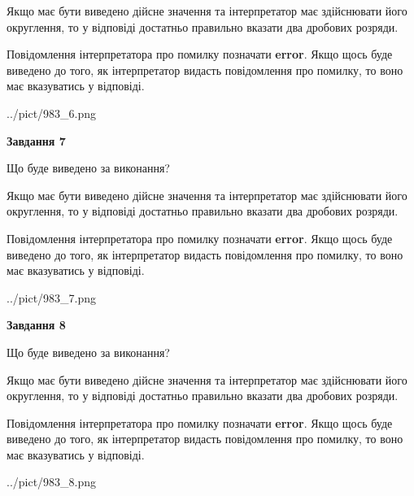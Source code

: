\documentclass[12pt, ukrainian]{article}
\begin{document}
{\begin {Large}
Якщо має бути виведено дійсне значення та інтерпретатор має здійснювати його округлення, 
то у відповіді достатньо правильно вказати два дробових розряди.

Повідомлення інтерпретатора про помилку позначати \textbf{error}.
Якщо щось буде виведено до того, як інтерпретатор видасть повідомлення про помилку, 
то воно має вказуватись у відповіді. \par

\begin{center}
	{../pict/983_6.png}
\end{center}
\newpage

{\begin {center}\textbf{Завдання 7}\end {center}}\par
Що буде виведено за виконання? \par

Якщо має бути виведено дійсне значення та інтерпретатор має здійснювати його округлення, 
то у відповіді достатньо правильно вказати два дробових розряди.

Повідомлення інтерпретатора про помилку позначати \textbf{error}.
Якщо щось буде виведено до того, як інтерпретатор видасть повідомлення про помилку, 
то воно має вказуватись у відповіді. \par

\begin{center}
	{../pict/983_7.png}
\end{center}
\newpage

{\begin {center}\textbf{Завдання 8}\end {center}}\par
Що буде виведено за виконання? \par

Якщо має бути виведено дійсне значення та інтерпретатор має здійснювати його округлення, 
то у відповіді достатньо правильно вказати два дробових розряди.

Повідомлення інтерпретатора про помилку позначати \textbf{error}.
Якщо щось буде виведено до того, як інтерпретатор видасть повідомлення про помилку, 
то воно має вказуватись у відповіді. \par

\begin{center}
	{../pict/983_8.png}
\end{center}
\newpage


\end{Large}}
\end{document}
